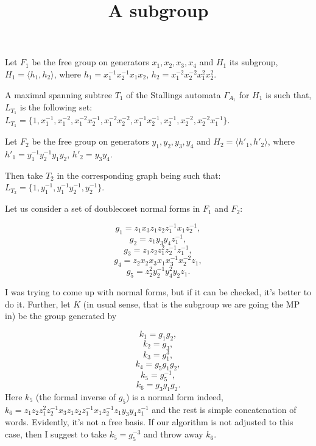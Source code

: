 \documentclass[a4paper,12pt]{article}
\title{A subgroup}
\newcommand{\G}{\Gamma }
\numberwithin{equation}{section}
\numberwithin{figure}{section}
\newcommand{\la}{\langle}
\newcommand{\ra}{\rangle}
\begin{document}
Let $F_1$ be the free group on generators $x_1,x_2, x_3,x_4$ and $H_1$ its
subgroup, $H_1=\la
h_1,h_2\ra$, where  $h_1= x_1^{-1} x_2^{-1} x_1 x_2$, $h_2 = x_1^{-2} x_2^{-2} x_1^2 x_2^2$.

A maximal spanning subtree $T_1$ of the Stallings automata $\G_{A_1}$ for $H_1$ is such that,
 $L_{T_1}$ is the following set:
 $L_{T_1}=\{1,x_1^{-1},x_1^{-2}, x_1^{-2}x_2^{-1}, x_1^{-2} x_2^{-2}, x_1^{-1} x_2^{-1}, x_2^{-1}, x_2^{-2}, x_2^{-2}x_1^{-1} \}$.
 
Let $F_2$ be the free group on generators $y_1,y_2, y_3,y_4$ and $H_2=\la
h'_1,h'_2\ra$, where  $h'_1= y_1^{-1} y_2^{-1} y_1 y_2$, $h'_2 = y_3 y_4$.

Then take $T_2$ in the corresponding graph being such that:
 $L_{T_2}=\{1,y_1^{-1},y_1^{-1} y_2^{-1}, y_2^{-1}\}$.

Let us consider a set of doublecoset normal forms in $F_1$ and $F_2$:

\[g_1= z_1 x_3 z_1 z_2 z_1^{-1}x_1 z_2^{-1},\]
\[g_2= z_1 y_3 y_4 z_1^{-1},\]
\[g_3= z_1 z_2 z_1^{2}z_2^{-1} z_1^{-1},\]
\[g_4= z_2 x_2 x_3 x_1 x_3^{-1} x_2^{-2} z_1,\]
\[g_5= z_2^2 y_2^{-1} y_4^2 y_2 z_1.\]

I was trying to come up with normal forms, but if it can be checked, it's better to do it. 
Further, let $K$ (in usual sense, that is the subgroup we are going the MP in) be the group generated by


\[k_1= g_1 g_2,\]
\[k_2= g_3,\]
\[k_3= g_1^3,\]
\[k_4= g_5 g_1 g_2,\]
\[k_5= g_5^{-1},\]
\[k_6= g_3g_1g_2.\]
Here $k_5$ (the formal inverse of $g_5$) is a normal form indeed, $k_6 = z_1 z_2 z_1^{2}z_2^{-1} x_3 z_1 z_2 z_1^{-1}x_1 z_2^{-1}z_1 y_3 y_4 z_1^{-1}$ and the rest is simple concatenation of words. Evidently, it's not a free basis. If our algorithm is not adjusted to this case, then I suggest to take $k_5 = g_5^{-3}$ and throw away $k_6$.
\end{document}
